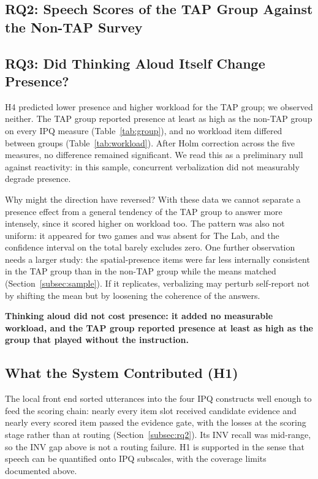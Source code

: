 \subsection{RQ2: Speech Scores of the TAP Group Against the Non-TAP Survey}


\subsection{RQ3: Did Thinking Aloud Itself Change Presence?}

H4 predicted lower presence and higher workload for the TAP group; we observed neither. The TAP group reported presence at least as high as the non-TAP group on every IPQ measure (Table~\ref{tab:group}), and no workload item differed between groups (Table~\ref{tab:workload}). After Holm correction across the five measures, no difference remained significant. We read this as a preliminary null against reactivity: in this sample, concurrent verbalization did not measurably degrade presence.

Why might the direction have reversed? With these data we cannot separate a presence effect from a general tendency of the TAP group to answer more intensely, since it scored higher on workload too. The pattern was also not uniform: it appeared for two games and was absent for The Lab, and the confidence interval on the total barely excludes zero. One further observation needs a larger study: the spatial-presence items were far less internally consistent in the TAP group than in the non-TAP group while the means matched (Section~\ref{subsec:sample}). If it replicates, verbalizing may perturb self-report not by shifting the mean but by loosening the coherence of the answers.

\textbf{Thinking aloud did not cost presence: it added no measurable workload, and the TAP group reported presence at least as high as the group that played without the instruction.}

\subsection{What the System Contributed (H1)}

The local front end sorted utterances into the four IPQ constructs well enough to feed the scoring chain: nearly every item slot received candidate evidence and nearly every scored item passed the evidence gate, with the losses at the scoring stage rather than at routing (Section~\ref{subsec:rq2}). Its INV recall was mid-range, so the INV gap above is not a routing failure. H1 is supported in the sense that speech can be quantified onto IPQ subscales, with the coverage limits documented above.

